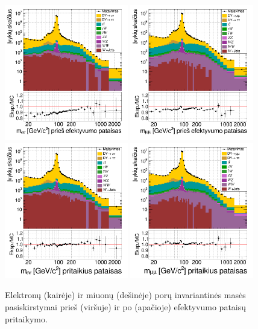 \documentclass[a4paper, 12pt, twoside]{article}
\begin{document}
\begin{figure}[tbp]
	\includegraphics[width=0.48\textwidth]{ee_mass_beforeSF.png}
	\includegraphics[width=0.48\textwidth]{mumu_mass_beforeSF.png}
	\includegraphics[width=0.48\textwidth]{ee_mass_after.png}
	\includegraphics[width=0.48\textwidth]{mumu_mass_after.png}
	\caption{\label{fig:invMba} Elektronų (kairėje) ir miuonų (dešinėje) porų invariantinės masės pasiskirstymai
		prieš (viršuje) ir po (apačioje) efektyvumo pataisų pritaikymo.}
\end{figure}
\end{document}
